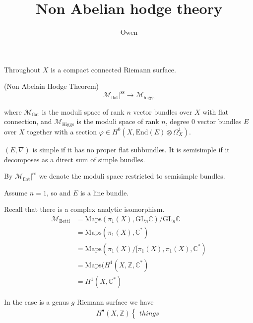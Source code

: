 % 


\title{Non Abelian hodge theory}
\author{Owen}
\date{}

 
\maketitle

Throughout $X$ is  a compact connected Riemann surface. 


\begin{theorem}
    (Non Abelain Hodge Theorem)
    \begin{equation}
        \mathcal{M}_{\mathrm{flat}}|^{\mathrm{ss}} \rightarrow  \mathcal{M}_{\mathrm{higgs}} 
    \end{equation}
\end{theorem}
where $\mathcal{M}_{\mathrm{flat}}$ is the moduli space of rank $n$ vector bundles over $X$ with flat connection, 
and $\mathcal{M}_{\mathrm{Higgs}}$ is the moduli space of rank $n$, degree $0$ vector bundles $E$ over $X$ together with a section $\varphi \in H^0 (X, \mathrm{End}(E) \otimes \Omega^1 _X) $. 

\begin{definition}
    $(E, \nabla)$ is simple if it has no proper flat subbundles. 
    It is semisimple if it decomposes as a direct sum of simple bundles. 
\end{definition}
By $ \mathcal{M}_{\mathrm{flat}}|^{\mathrm{ss}} $ we denote the moduli space restricted to semisimple bundles. 

Assume $n=1$, so and $E$ is a line bundle. 

Recall that there is a complex analytic isomorphism. 
\begin{align}
    \mathcal{M}_{\mathrm{Betti}} & = \mathrm{Maps}(\pi_1 ( X) , \mathrm{GL}_n \mathbb{C} ) / \mathrm{GL}_n \mathbb{C}  \\
    & = \mathrm{Maps}(\pi_1 ( X) , \mathbb{C} ^*) \\
    & = \mathrm{Maps}(\pi_1 ( X)/[\pi_1(X) , \pi_1(X) , \mathbb{C} ^*) \\
    & = \mathrm{Maps}(H^1(X, \mathbb{Z} , \mathbb{C} ^*) \\
    & = H^1(X, \mathbb{C} ^*) 
\end{align}

In the case is a genus $g$ Riemann surface we have 
\begin{align}
    H^\bullet (X, \mathbb{Z} ) \begin{cases}
        things 
    \end{cases} 
\end{align}


